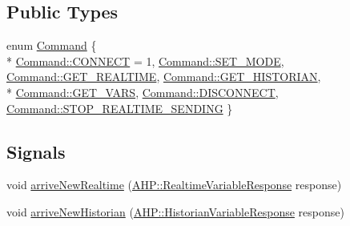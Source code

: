 \subsection*{Public Types}
\begin{DoxyCompactItemize}
\item 
enum \hyperlink{class_client_worker_a4f4d6c3f13641a69ab19cc5114b58b91}{Command} \{ \\*
\hyperlink{class_client_worker_a4f4d6c3f13641a69ab19cc5114b58b91ab57e2519e26151feacdbe52076bc39ec}{Command\+::\+C\+O\+N\+N\+E\+C\+T} = 1, 
\hyperlink{class_client_worker_a4f4d6c3f13641a69ab19cc5114b58b91ad764d5dd2cef4f6e2c24d5c1b49df017}{Command\+::\+S\+E\+T\+\_\+\+M\+O\+D\+E}, 
\hyperlink{class_client_worker_a4f4d6c3f13641a69ab19cc5114b58b91a42b044864ac8b899c89fe26c3a52fe98}{Command\+::\+G\+E\+T\+\_\+\+R\+E\+A\+L\+T\+I\+M\+E}, 
\hyperlink{class_client_worker_a4f4d6c3f13641a69ab19cc5114b58b91a2440b9a4f3bcb711ddc6134e3bbcf7b9}{Command\+::\+G\+E\+T\+\_\+\+H\+I\+S\+T\+O\+R\+I\+A\+N}, 
\\*
\hyperlink{class_client_worker_a4f4d6c3f13641a69ab19cc5114b58b91af745888ccd8e7be4b82c947dbac6b61c}{Command\+::\+G\+E\+T\+\_\+\+V\+A\+R\+S}, 
\hyperlink{class_client_worker_a4f4d6c3f13641a69ab19cc5114b58b91add7cd0eb57db08d4f98abc48e5593462}{Command\+::\+D\+I\+S\+C\+O\+N\+N\+E\+C\+T}, 
\hyperlink{class_client_worker_a4f4d6c3f13641a69ab19cc5114b58b91a675775735b8a9632b54b03e4626b4e5f}{Command\+::\+S\+T\+O\+P\+\_\+\+R\+E\+A\+L\+T\+I\+M\+E\+\_\+\+S\+E\+N\+D\+I\+N\+G}
 \}
\end{DoxyCompactItemize}
\subsection*{Signals}
\begin{DoxyCompactItemize}
\item 
void \hyperlink{class_client_worker_a0983dfbdf14011cfdd08a5a7c832d9f4}{arrive\+New\+Realtime} (\hyperlink{class_a_h_p_1_1_realtime_variable_response}{A\+H\+P\+::\+Realtime\+Variable\+Response} response)
\item 
void \hyperlink{class_client_worker_aff294a5a74cd60039d3a58fab0f20a0a}{arrive\+New\+Historian} (\hyperlink{class_a_h_p_1_1_historian_variable_response}{A\+H\+P\+::\+Historian\+Variable\+Response} response)
\end{DoxyCompactItemize}
